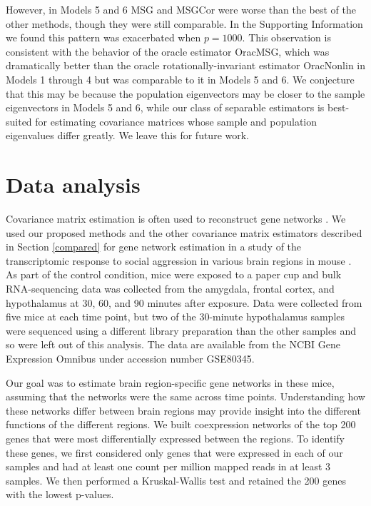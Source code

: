 \documentclass[useAMS,referee,usenatbib]{biom}
\begin{document}
However, in Models 5 and 6 MSG and MSGCor were worse than the best of the other methods, though they were still comparable. In the Supporting Information we found this pattern was exacerbated when $p = 1000$. This observation is consistent with the behavior of the oracle estimator OracMSG, which was dramatically better than the oracle rotationally-invariant estimator OracNonlin in Models 1 through 4 but was comparable to it in Models 5 and 6. We conjecture that this may be because the population eigenvectors may be closer to the sample eigenvectors in Models 5 and 6, while our class of separable estimators is best-suited for estimating covariance matrices whose sample and population eigenvalues differ greatly. We leave this for future work.


\section{Data analysis}
\label{gene analysis}

Covariance matrix estimation is often used to reconstruct gene networks \citep{markowetz2007inferring}. We used our proposed methods and the other covariance matrix estimators described in Section \ref{compared} for gene network estimation in a study of the transcriptomic response to social aggression in various brain regions in mouse \citep{saul2017transcriptional}. As part of the control condition, mice were exposed to a paper cup and bulk RNA-sequencing data was collected from the amygdala, frontal cortex, and hypothalamus at 30, 60, and 90 minutes after exposure. Data were collected from five mice at each time point, but two of the 30-minute hypothalamus samples were sequenced using a different library preparation than the other samples and so were left out of this analysis. The data are available from the NCBI Gene Expression Omnibus under accession number GSE80345.

Our goal was to estimate brain region-specific gene networks in these mice, assuming that the networks were the same across time points. Understanding how these networks differ between brain regions may provide insight into the different functions of the different regions. We built coexpression networks of the top 200 genes that were most differentially expressed between the regions. To identify these genes, we first considered only genes that were expressed in each of our samples and had at least one count per million mapped reads in at least 3 samples. We then performed a Kruskal-Wallis test and retained the 200 genes with the lowest p-values.
\end{document}

